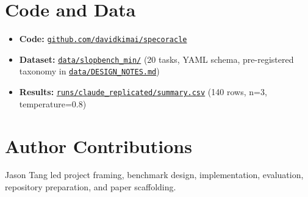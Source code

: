 \documentclass[11pt]{article}
\begin{document}
\section*{Code and Data}

\begin{itemize}[label={-}]
  \item \textbf{Code:} \href{https://github.com/davidkimai/specoracle}{\texttt{github.com/davidkimai/specoracle}}
  \item \textbf{Dataset:} \href{https://github.com/davidkimai/specoracle/tree/main/data/slopbench_min}{\texttt{data/slopbench\_min/}} (20 tasks, YAML schema, pre-registered taxonomy in \href{https://github.com/davidkimai/specoracle/blob/main/data/DESIGN_NOTES.md}{\texttt{data/DESIGN\_NOTES.md}})
  \item \textbf{Results:} \href{https://github.com/davidkimai/specoracle/blob/main/runs/claude_replicated/summary.csv}{\texttt{runs/claude\_replicated/summary.csv}} (140 rows, n=3, temperature=0.8)
\end{itemize}

\section*{Author Contributions}

Jason Tang led project framing, benchmark design, implementation, evaluation,
repository preparation, and paper scaffolding.
\end{document}
